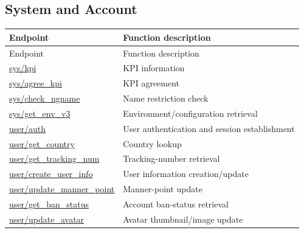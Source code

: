 \subsection{System and Account}

\begin{longtable}{>{\ttfamily}p{}p{}}
\toprule
Endpoint & Function description \\
\midrule
\endfirsthead%

\toprule
Endpoint & Function description \\
\midrule
\endhead%

\hyperref[subsec:api_sys_kpi]
    {sys/kpi}
    & KPI information \\

\hyperref[subsec:api_sys_agree_kpi]
    {sys/agree\_kpi}
    & KPI agreement \\

\hyperref[subsec:api_sys_check_ngname]
    {sys/check\_ngname}
    & Name restriction check \\

\hyperref[subsec:api_sys_get_env_v3]
    {sys/get\_env\_v3}
    & Environment/configuration retrieval \\

\hyperref[subsec:api_user_auth]
    {user/auth}
    & User authentication and session establishment \\

\hyperref[subsec:api_user_get_country]
    {user/get\_country}
    & Country lookup \\

\hyperref[subsec:api_user_get_tracking_num]
    {user/get\_tracking\_num}
    & Tracking-number retrieval \\

\hyperref[subsec:api_user_create_user_info]
    {user/create\_user\_info}
    & User information creation/update \\

\hyperref[subsec:api_user_update_manner_point]
    {user/update\_manner\_point}
    & Manner-point update \\

\hyperref[subsec:api_user_get_ban_status]
    {user/get\_ban\_status}
    & Account ban-status retrieval \\

\hyperref[subsec:api_user_update_avatar]
    {user/update\_avatar}
    & Avatar thumbnail/image update \\

\bottomrule
\end{longtable}